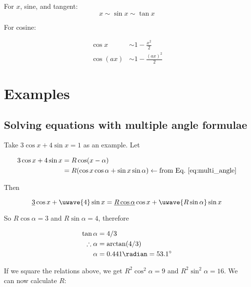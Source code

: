 \noindent{}For $x$, sine, and tangent:
\begin{equation}
    x \sim \sin x \sim \tan x
\end{equation}

\noindent{}For cosine:

\begin{equation}
    \begin{aligned}
        \cos x &\sim 1 - \frac{x^2}{2}\\
        \cos (ax) &\sim 1 - \frac{(ax)^2}{2}
    \end{aligned}
\end{equation}


\section{Examples}

\subsection{Solving equations with multiple angle formulae}

Take $3\cos x + 4\sin x = 1$ as an example. Let

\begin{equation*}
    \begin{aligned}
    3\cos x + 4\sin x &= R\cos (x - \alpha) \\
    &= R(\cos x \cos \alpha + \sin x \sin \alpha) \leftarrow \text{from Eq.~\ref{eq:multi_angle}}
    \end{aligned}
\end{equation*}

\noindent{}Then

\begin{equation*}
    \underline{3}\cos x + \uwave{4}\sin x = \underline{R\cos\alpha} \cos x + \uwave{R\sin\alpha} \sin x
\end{equation*}

\noindent{}So $R\cos\alpha = 3$ and $R\sin\alpha = 4$, therefore

\begin{equation*}
    \begin{aligned}
    \tan\alpha &= 4/3\\
    \therefore \alpha &= \arctan (4/3)\\
    \alpha &= 0.441 \radian = 53.1^{\circ}
    \end{aligned}
\end{equation*}

\noindent{}If we square the relations above, we get $R^2\cos^2\alpha = 9$ and $R^2\sin^2\alpha = 16$. We can now calculate $R$:


